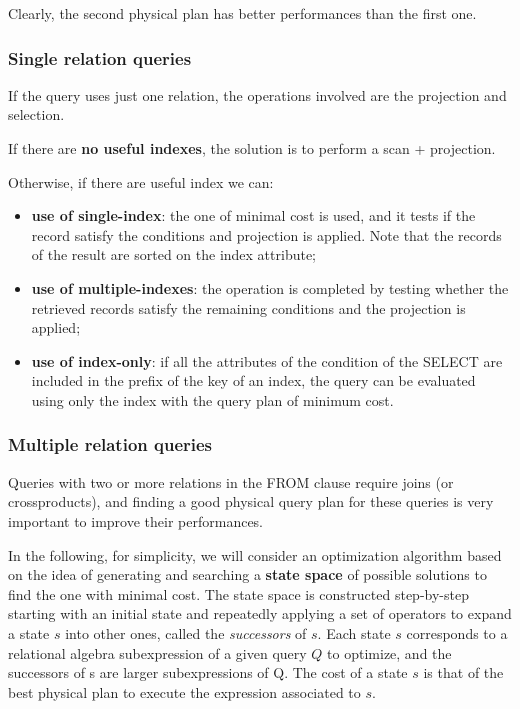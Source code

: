 Clearly, the second physical plan has better performances than the first one.

\subsubsection{Single relation queries}
If the query uses just one relation, the operations involved are the projection and selection.

If there are \textbf{no useful indexes}, the solution is to perform a scan + projection.

Otherwise, if there are useful index we can:

\begin{itemize}
    \item \textbf{use of single-index}: the one of minimal cost is used, and it tests if the record satisfy the conditions and projection is applied. Note that the records of the result are sorted on the index attribute;
    
    \item \textbf{use of multiple-indexes}: the operation is completed by testing whether the retrieved records satisfy the remaining conditions and the projection is applied;

    \item \textbf{use of index-only}: if all the attributes of the condition of the SELECT are included in the prefix of the key of an index, the query can be evaluated using only the index with the query plan of minimum cost.
    
\end{itemize}

\subsubsection{Multiple relation queries}
Queries with two or more relations in the FROM clause require joins (or crossproducts), and finding a good physical query plan for these queries is very important to improve their performances. 

In the following, for simplicity, we will consider an optimization algorithm based on the idea of generating and searching a \textbf{state space} of possible solutions to find the one with minimal cost. The state space is constructed step-by-step starting with an initial state and repeatedly applying a set of operators to expand a state $s$ into other ones, called the \textit{successors} of $s$. Each state $s$ corresponds to a relational algebra subexpression of a given query $Q$ to optimize, and the successors of s are larger subexpressions of Q. The cost of a state $s$ is that of the best physical plan to execute the expression associated to $s$. 

